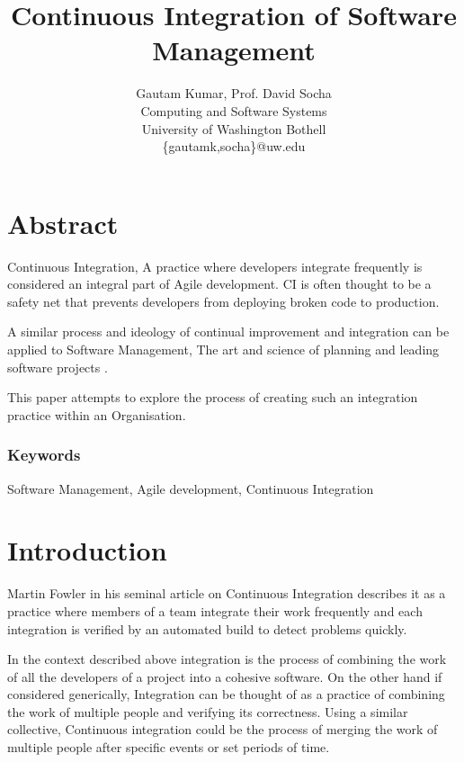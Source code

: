 \documentclass[12pt,conference]{IEEEtran}
\begin{document}
\title{Continuous Integration of Software Management}


\author{
{\rm Gautam Kumar, Prof. David Socha}\\
Computing and Software Systems\\
University of Washington Bothell\\
\{gautamk,socha\}@uw.edu
} %

\maketitle
\thispagestyle{empty}


\section*{Abstract}
Continuous Integration, A practice where developers integrate 
frequently \cite{stahl_modeling_2014} is considered an integral part of Agile 
development. CI is often thought to be a safety net that prevents developers from deploying broken code to production. 

A similar process and ideology of continual improvement and integration can be applied to Software Management, The art and science of planning and leading software projects \cite{stellman_applied_2005}.

This paper attempts to explore the process of creating such an integration practice within an Organisation.

\subsubsection*{Keywords}

Software Management, Agile development, Continuous Integration

\section*{Introduction}

Martin Fowler in his seminal article \cite{fowler_continuous_2006} on Continuous Integration describes it as a practice where members of a team integrate their work frequently and each integration is verified by an automated build to detect problems quickly.

In the context described above integration is the process of combining the work of all the developers of a project into a cohesive software. On the other hand if considered generically, Integration can be thought of as a practice of combining the work of multiple people and verifying its correctness. Using a similar collective, Continuous integration could be the process of merging the work of multiple people after specific events or set periods of time.
\end{document}

